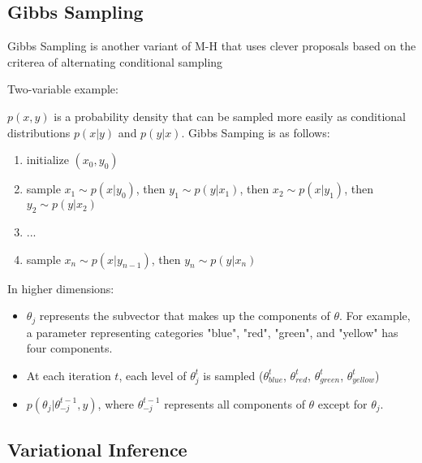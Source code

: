 \subsection{Gibbs Sampling}

Gibbs Sampling is another variant of M-H that uses clever proposals based on the criterea of alternating conditional sampling

Two-variable example: \cite{geman1984stochastic}  

$p(x,y)$ is a probability density that can be sampled more easily as conditional distributions $p(x|y)$ and $p(y|x)$.  Gibbs Samping is as follows:
\begin{enumerate}
\item{initialize $(x_0,y_0)$}
\item{sample $x_1 \sim p(x|y_0)$, then $y_1 \sim p(y|x_1)$, then $x_2 \sim p(x|y_1)$, then $y_2 \sim p(y|x_2)$}
\item{ ...}
\item{sample $x_n \sim p(x|y_{n-1})$, then $y_n \sim p(y|x_n)$}
\end{enumerate}

In higher dimensions:

\begin{itemize}
\tightlist
\item{$\theta_j$ represents the subvector that makes up the components of $\theta$.  For example, a parameter representing categories "blue", "red", "green", and "yellow" has four components.}
\item{At each iteration $t$, each level of $\theta^t_j$ is sampled ($\theta^t_{blue}$, $\theta^t_{red}$, $\theta^t_{green}$, $\theta^t_{yellow}$)}
\item{ $p(\theta_j|\theta^{t-1}_{-j},y)$, where $\theta^{t-1}_{-j}$ represents all components of $\theta$ except for $\theta_j$.}
\end{itemize}







\subsection{Variational Inference}

